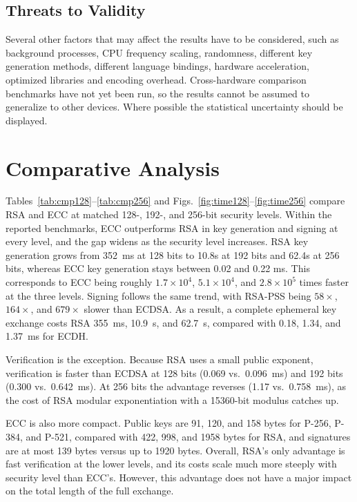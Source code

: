 \documentclass[conference]{IEEEtran}
\begin{document}
\subsection{Threats to Validity}

Several other factors that may affect the results have to be considered, such as background processes, CPU frequency scaling, randomness, different key generation methods, different language bindings, hardware acceleration, optimized libraries and encoding overhead. Cross-hardware comparison benchmarks have not yet been run, so the results cannot be assumed to generalize to other devices. Where possible the statistical uncertainty should be displayed.

\section{Comparative Analysis}


Tables~\ref{tab:cmp128}--\ref{tab:cmp256} and
Figs.~\ref{fig:time128}--\ref{fig:time256} compare RSA and ECC at matched
128-, 192-, and 256-bit security levels. Within the reported benchmarks,
ECC outperforms RSA in key generation and signing at every level, and the
gap widens as the security level increases. RSA key generation grows from 352~ms at 128 bits to
10.8s at 192 bits and 62.4s at 256 bits, whereas ECC key generation stays
between 0.02 and 0.22 ms. This corresponds to ECC being roughly
$1.7\times10^{4}$, $5.1\times10^{4}$, and $2.8\times10^{5}$ times faster at
the three levels. Signing follows the same trend, with RSA-PSS being
$58\times$, $164\times$, and $679\times$ slower than ECDSA. As a result, a
complete ephemeral key exchange costs RSA 355~ms, 10.9~s, and 62.7~s,
compared with 0.18, 1.34, and 1.37~ms for ECDH.

Verification is the exception. Because RSA uses a small public exponent,
verification is faster than ECDSA at 128 bits (0.069 vs.\ 0.096~ms) and 192
bits (0.300 vs.\ 0.642~ms). At 256 bits the advantage reverses (1.17 vs.\
0.758~ms), as the cost of RSA modular exponentiation with a 15360-bit modulus
catches up.

ECC is also more compact. Public keys are 91, 120, and 158 bytes for P-256,
P-384, and P-521, compared with 422, 998, and 1958 bytes for RSA, and
signatures are at most 139 bytes versus up to 1920 bytes. Overall, RSA's
only advantage is fast verification at the lower levels, and its costs
scale much more steeply with security level than ECC's. However, this advantage 
does not have a major impact on the total length of the full exchange.
\end{document}
